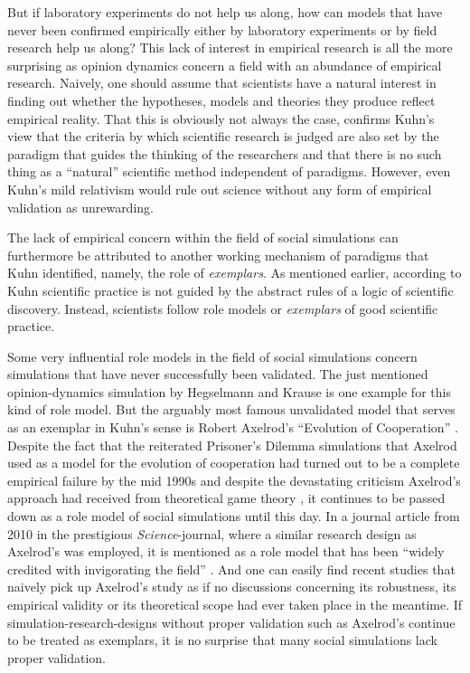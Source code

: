\documentclass[12pt, a4paper]{article}
\begin{document}
But if laboratory experiments do not help us along, how can models
that have never been confirmed empirically either by laboratory
experiments or by field research help us along? This lack of interest
in empirical research is all the more surprising as opinion dynamics
concern a field with an abundance of empirical research. Naively, one
should assume that scientists have a natural interest in finding out
whether the hypotheses, models and theories they produce reflect
empirical reality. That this is obviously not always the case,
confirms Kuhn's view that the criteria by which scientific research is
judged are also set by the paradigm that guides the thinking of the
researchers and that there is no such thing as a ``natural''
scientific method independent of paradigms. However, even Kuhn's mild
relativism would rule out science without any form of empirical
validation as unrewarding.

The lack of empirical concern within the field of social simulations
can furthermore be attributed to another working mechanism of
paradigms that Kuhn identified, namely, the role of {\em exemplars}.
As mentioned earlier, according to Kuhn scientific practice is not
guided by the abstract rules of a logic of scientific discovery.
Instead, scientists follow role models or {\em exemplars} of good
scientific practice.

Some very influential role models in the field of social simulations
concern simulations that have never successfully been validated. The
just mentioned opinion-dynamics simulation by Hegselmann and Krause is
one example for this kind of role model. But the arguably most famous
unvalidated model that serves as an exemplar in Kuhn's sense is Robert
Axelrod's ``Evolution of Cooperation'' \citep{axelrod:1984}. Despite
the fact that the reiterated Prisoner's Dilemma simulations that
Axelrod used as a model for the evolution of cooperation had turned
out to be a complete empirical failure by the mid 1990s
\citep{dugatkin:1997} and despite the devastating criticism Axelrod's
approach had received from theoretical game theory
\citep{binmore:1994, binmore:1998}, it continues to be passed down as
a role model of social simulations until this day. In a journal
article from 2010 in the prestigious {\em Science}-journal, where a
similar research design as Axelrod's was employed, it is mentioned as
a role model that has been ``widely credited with invigorating the
field'' \citep[2008f.]{rendell-et-al:2010a}. And one can easily find
recent studies \citep{phelps:2016} that naively pick up Axelrod's
study as if no discussions concerning its robustness, its empirical
validity or its theoretical scope had ever taken place in the
meantime. If simulation-research-designs without proper validation
such as Axelrod's continue to be treated as exemplars, it is no
surprise that many social simulations lack proper validation.
\end{document}

